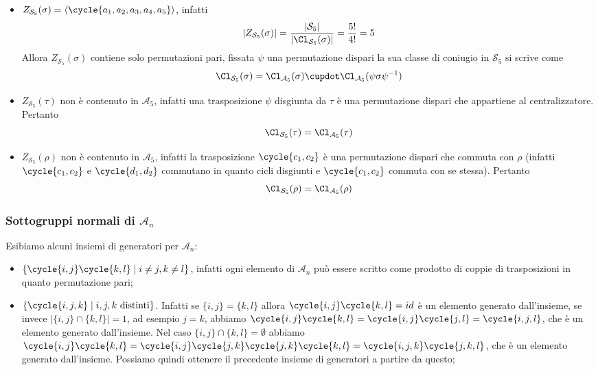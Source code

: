 \documentclass[11pt]{scrartcl}
\begin{document}
\begin{itemize}
    \item $Z_{\mathcal{S}_5}(\sigma) = \langle\cycle{a_1, a_2, a_3, a_4, a_5}\rangle$,
    infatti 
    \[
        |Z_{\mathcal{S}_5}(\sigma)| = \frac{|\mathcal{S}_5|}{|\Cl_{\mathcal{S}_5}(\sigma)|} = \frac{5!}{4!} = 5
    \]
    Allora $Z_{\mathcal{S}_5}(\sigma)$ contiene solo permutazioni pari, fissata $\psi$
    una permutazione dispari la sua
    classe di coniugio in $\mathcal{S}_5$ si scrive come
    \[
        \Cl_{\mathcal{S}_5}(\sigma) = \Cl_{\mathcal{A}_5}(\sigma) \cupdot \Cl_{\mathcal{A}_5}(\psi\sigma\psi^{-1})
    \]
    \item $Z_{\mathcal{S}_5}(\tau)$ non è contenuto in $\mathcal{A}_5$, infatti una
    trasposizione $\psi$ disgiunta da $\tau$ è una permutazione dispari che
    appartiene al centralizzatore. Pertanto
    \[
        \Cl_{\mathcal{S}_5}(\tau) = \Cl_{\mathcal{A}_5}(\tau)
    \]
    \item $Z_{\mathcal{S}_5}(\rho)$ non è contenuto in $\mathcal{A}_5$, infatti la 
    trasposizione $\cycle{c_1, c_2}$ è una permutazione dispari che commuta
    con $\rho$ (infatti $\cycle{c_1, c_2}$ e $\cycle{d_1, d_2}$ commutano in 
    quanto cicli disgiunti e $\cycle{c_1, c_2}$ commuta con se stessa).
    Pertanto 
    \[
        \Cl_{\mathcal{S}_5}(\rho) = \Cl_{\mathcal{A}_5}(\rho)
    \]
\end{itemize}

\subsubsection{Sottogruppi normali di $\mathcal{A}_n$}

Esibiamo alcuni insiemi di generatori per $\mathcal{A}_n$:
\begin{itemize}
    \item $\{\cycle{i, j}\cycle{k, l}\mid i\neq j, k \neq l\}$, infatti
    ogni elemento di $\mathcal{A}_n$ può essere scritto come prodotto di 
    coppie di trasposizioni in quanto permutazione pari;
    \item $\{\cycle{i, j, k}\mid i, j, k\text{ distinti}\}$. Infatti se 
    $\{i, j\} = \{k, l\}$ allora $\cycle{i, j}\cycle{k, l} = id$ è un elemento
    generato dall'insieme, se invece $|\{i, j\}\cap\{k, l\}| = 1$, ad esempio $j = k$,
    abbiamo $\cycle{i, j}\cycle{k, l} = \cycle{i, j}\cycle{j, l} = \cycle{i, j, l}$,
    che è un elemento generato dall'insieme. Nel caso $\{i, j\}\cap \{k, l\} = \emptyset$ abbiamo
    $\cycle{i, j}\cycle{k, l} = \cycle{i, j}\cycle{j, k}\cycle{j, k}\cycle{k, l}=
    \cycle{i, j, k}\cycle{j, k, l}$, che è un elemento generato dall'insieme.
    Possiamo quindi ottenere il precedente insieme di generatori a partire
    da questo;
\end{itemize}
\end{document}
